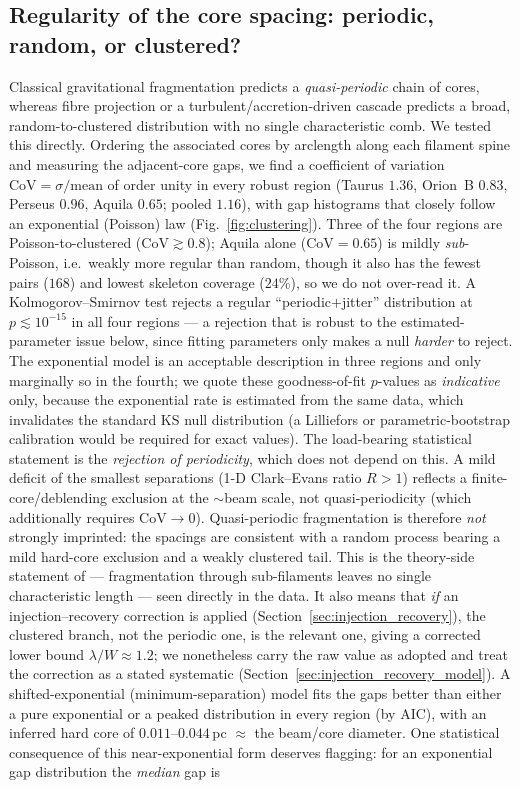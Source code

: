 \documentclass[usenatbib,twoside,twocolumn]{mnras}
\begin{document}
\subsection{Regularity of the core spacing: periodic, random, or clustered?}
\label{sec:clustering}
Classical gravitational fragmentation predicts a \emph{quasi-periodic} chain of cores, whereas fibre projection or a turbulent/accretion-driven cascade predicts a broad, random-to-clustered distribution with no single characteristic comb. We tested this directly. Ordering the associated cores by arclength along each filament spine and measuring the adjacent-core gaps, we find a coefficient of variation $\mathrm{CoV}=\sigma/\mathrm{mean}$ of order unity in every robust region (Taurus $1.36$, Orion~B $0.83$, Perseus $0.96$, Aquila $0.65$; pooled $1.16$), with gap histograms that closely follow an exponential (Poisson) law (Fig.~\ref{fig:clustering}). Three of the four regions are Poisson-to-clustered ($\mathrm{CoV}\gtrsim0.8$); Aquila alone ($\mathrm{CoV}=0.65$) is mildly \emph{sub}-Poisson, i.e.\ weakly more regular than random, though it also has the fewest pairs ($168$) and lowest skeleton coverage ($24\%$), so we do not over-read it. A Kolmogorov--Smirnov test rejects a regular ``periodic$+$jitter'' distribution at $p\lesssim10^{-15}$ in all four regions --- a rejection that is robust to the estimated-parameter issue below, since fitting parameters only makes a null \emph{harder} to reject. The exponential model is an acceptable description in three regions and only marginally so in the fourth; we quote these goodness-of-fit $p$-values as \emph{indicative} only, because the exponential rate is estimated from the same data, which invalidates the standard KS null distribution (a Lilliefors or parametric-bootstrap calibration would be required for exact values). The load-bearing statistical statement is the \emph{rejection of periodicity}, which does not depend on this. A mild deficit of the smallest separations (1-D Clark--Evans ratio $R>1$) reflects a finite-core/deblending exclusion at the $\sim$beam scale, not quasi-periodicity (which additionally requires $\mathrm{CoV}\!\to\!0$). Quasi-periodic fragmentation is therefore \emph{not} strongly imprinted: the spacings are consistent with a random process bearing a mild hard-core exclusion and a weakly clustered tail. This is the theory-side statement of \citet{Clarke2020} --- fragmentation through sub-filaments leaves no single characteristic length --- seen directly in the data. It also means that \emph{if} an injection--recovery correction is applied (Section~\ref{sec:injection_recovery}), the clustered branch, not the periodic one, is the relevant one, giving a corrected lower bound $\lambda/W\approx1.2$; we nonetheless carry the raw value as adopted and treat the correction as a stated systematic (Section~\ref{sec:injection_recovery_model}). A shifted-exponential (minimum-separation) model fits the gaps better than either a pure exponential or a peaked distribution in every region (by AIC), with an inferred hard core of $0.011$--$0.044$\,pc $\approx$ the beam/core diameter. One statistical consequence of this near-exponential form deserves flagging: for an exponential gap distribution the \emph{median} gap is 
\end{document}
